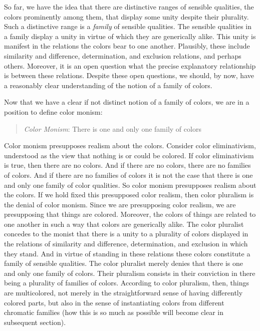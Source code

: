 \documentclass[12pt]{article}
\begin{document}
So far, we have the idea that there are distinctive ranges of sensible qualities, the colors prominently among them, that display some unity despite their plurality. Such a distinctive range is a \emph{family} of sensible qualities. The sensible qualities in a family display a unity in virtue of which they are generically alike. This unity is manifest in the relations the colors bear to one another. Plausibly, these include similarity and difference, determination, and exclusion relations, and perhaps others. Moreover, it is an open question what the precise explanatory relationship is between these relations. Despite these open questions, we should, by now, have a reasonably clear understanding of the notion of a family of colors.

Now that we have a clear if not distinct notion of a family of colors, we are in a position to define color monism:
\begin{quote}
	\emph{Color Monism}: There is one and only one family of colors
\end{quote}
Color monism presupposes realism about the colors. Consider color eliminativism, understood as the view that nothing is or could be colored. If color eliminativism is true, then there are no colors. And if there are no colors, there are no families of colors. And if there are no families of colors it is not the case that there is one and only one family of color qualities. So color monism presupposes realism about the colors. If we hold fixed this presupposed color realism, then color pluralism is the denial of color monism. Since we are presupposing color realism, we are presupposing that things are colored. Moreover, the colors of things are related to one another in such a way that colors are generically alike. The color pluralist concedes to the monist that there is a unity to a plurality of colors displayed in the relations of similarity and difference, determination, and exclusion in which they stand. And in virtue of standing in these relations these colors constitute a family of sensible qualities. The color pluralist merely denies that there is one and only one family of colors. Their pluralism consists in their conviction in there being a plurality of families of colors. According to color pluralism, then, things are multicolored, not merely in the straightforward sense of having differently colored parts, but also in the sense of instantiating colors from different chromatic families (how this is so much as possible will become clear in subsequent section).
\end{document}
